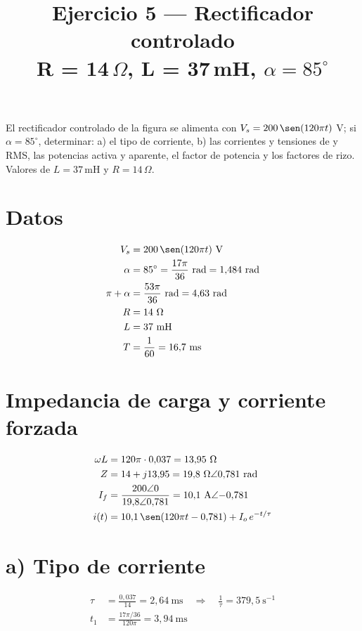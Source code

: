 \documentclass[11pt]{article}
\title{Ejercicio 5 --- Rectificador controlado\\ R = 14\,$\Omega$, L = 37\,mH, $\alpha=85^\circ$}
\author{}
\date{}
\begin{document}
\maketitle

El rectificador controlado de la figura se alimenta con $V_s = 200\,\sen(120\pi t)$ V;
si $\alpha=85^\circ$, determinar: a) el tipo de corriente, b) las corrientes y
tensiones de y RMS, las potencias activa y aparente, el factor de potencia y
los factores de rizo. Valores de $L=37$\,mH y $R=14\,\Omega$.

\section*{Datos}

\begin{align*}
V_s &= 200\,\sen(120\pi t)\ \text{V} \\
\alpha &= 85^\circ = \frac{17\pi}{36}\ \text{rad} = 1{,}484\ \text{rad} \\
\pi+\alpha &= \frac{53\pi}{36}\ \text{rad} = 4{,}63\ \text{rad} \\
R &= 14\ \Omega \\
L &= 37\ \text{mH} \\
T &= \frac{1}{60} = 16{,}7\ \text{ms}
\end{align*}

\section*{Impedancia de carga y corriente forzada}

\begin{align*}
\omega L &= 120\pi \cdot 0{,}037 = 13{,}95\ \Omega \\
Z &= 14 + j13{,}95 = 19{,}8\ \Omega \angle 0{,}781\ \text{rad} \\
I_f &= \frac{200\angle 0}{19{,}8\angle 0{,}781} = 10{,}1\ \text{A}\angle{-0{,}781} \\
i(t) &= 10{,}1\,\sen(120\pi t - 0{,}781) + I_o\,e^{-t/\tau}
\end{align*}

\section*{a) Tipo de corriente}

\begin{align*}
\tau &= \frac{0{,}037}{14} = 2{,}64\ \text{ms} \quad \Rightarrow \quad \frac{1}{\tau} = 379{,}5\ \text{s}^{-1} \\
t_1 &= \frac{17\pi/36}{120\pi} = 3{,}94\ \text{ms}
\end{align*}
\end{document}

